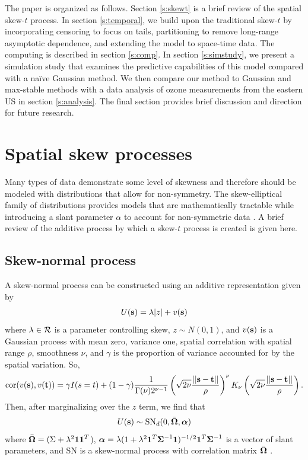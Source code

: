 \documentclass[11pt]{article}
\begin{document}
The paper is organized as follows.
Section \ref{s:skewt} is a brief review of the spatial skew-$t$ process.
In section \ref{s:temporal}, we build upon the traditional skew-$t$ by incorporating censoring to focus on tails, partitioning to remove long-range asymptotic dependence, and extending the model to space-time data.
The computing is described in section \ref{s:comp}.
In section \ref{s:simstudy}, we present a simulation study that examines the predictive capabilities of this model compared with a na{\"i}ve Gaussian method.
We then compare our method to Gaussian and max-stable methods with a data analysis of ozone measurements from the eastern US in section \ref{s:analysis}.
The final section provides brief discussion and direction for future research.

\section{Spatial skew processes}\label{s:spatialskew}
Many types of data demonstrate some level of skewness and therefore should be modeled with distributions that allow for non-symmetry.
The skew-elliptical family of distributions provides models that are mathematically tractable while introducing a slant parameter $\alpha$ to account for non-symmetric data \citep{Genton2004}.
A brief review of the additive process by which a skew-$t$ process is created is given here.

\subsection{Skew-normal process} \label{s:skewnorm}
A skew-normal process can be constructed using an additive representation \citep{Zhang2010} given by
\begin{align}
  U(\mbox{\bf s}) = \lambda |z| + v(\mbox{\bf s})
\end{align}
where $\lambda \in {\cal R}$ is a parameter controlling skew, $z \sim N(0, 1)$, and $v(\mbox{\bf s})$ is a Gaussian process with mean zero, variance one, \Matern spatial correlation with spatial range $\rho$, smoothness $\nu$, and $\gamma$ is the proportion of variance accounted for by the spatial variation.
So,
\begin{align}
  \text{cor}(v(\mbox{\bf s}), v(\mbox{\bf t})) = \gamma I(s = t) + (1 - \gamma)  \frac{ 1 }{ \Gamma(\nu) 2^{ \nu - 1}} \left( \sqrt{2\nu} \frac{ ||\mbox{\bf s} - \mbox{\bf t}|| }{ \rho } \right)^{\nu} K_{\nu} \left( \sqrt{2\nu} \frac{ ||\mbox{\bf s} - \mbox{\bf t}|| }{ \rho } \right).
\end{align}
Then, after marginalizing over the $z$ term, we find that
\begin{align}
  U(\mbox{\bf s}) \sim \text{SN}_d(0, \bar{\mbox{\boldmath $\Omega$}}, \mbox{\boldmath $\alpha$})
\end{align}
where $\bar{\mbox{\boldmath $\Omega$}} = (\Sigma + \lambda^2 \mbox{\boldmath $1$} \mbox{\boldmath $1$}^T$), $\mbox{\boldmath $\alpha$} = \lambda (1 + \lambda^2 \mbox{\boldmath $1$}^T \mbox{\boldmath $\Sigma$}^{-1} \mbox{\boldmath $1$})^{-1/2} \mbox{\boldmath $1$}^T \mbox{\boldmath $\Sigma$}^{-1}$ is a vector of slant parameters, and SN is a skew-normal process with correlation matrix $\bar{\mbox{\boldmath $\Omega$}}$ \citep{Azzalini2013}.
\end{document}
